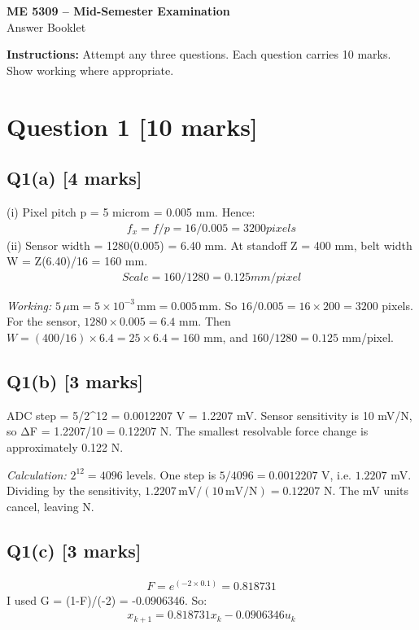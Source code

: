 \documentclass[11pt,a4paper]{article}
\begin{document}
\begin{center}
{\Large\bfseries ME 5309 -- Mid-Semester Examination}\\[3pt]
{\large Answer Booklet}\\[8pt]
\end{center}
\textbf{Instructions:} Attempt any three questions. Each question carries 10 marks. Show working where appropriate.
\section*{Question 1 \hfill [10 marks]}
\subsection*{Q1(a) \hfill [4 marks]}

(i) Pixel pitch p = 5 microm = 0.005 mm.
Hence:\[\begin{aligned}f_x = f/p = 16/0.005 = 3200 pixels\end{aligned}\]
(ii) Sensor width = 1280(0.005) = 6.40 mm.
At standoff Z = 400 mm, belt width W = Z(6.40)/16 = 160 mm.
\[\begin{aligned}Scale = 160/1280 = 0.125 mm/pixel\end{aligned}\]\par\smallskip\textit{Working:} $5\,\mu\mathrm{m}=5\times10^{-3}\,\mathrm{mm}=0.005\,\mathrm{mm}$. So $16/0.005=16\times200=3200$ pixels. For the sensor, $1280\times0.005=6.4$ mm. Then $W=(400/16)\times6.4=25\times6.4=160$ mm, and $160/1280=0.125$ mm/pixel.

\subsection*{Q1(b) \hfill [3 marks]}

ADC step = 5/2\textasciicircum{}12 = 0.0012207 V = 1.2207 mV.
Sensor sensitivity is 10 mV/N, so ΔF = 1.2207/10 = 0.12207 N.
The smallest resolvable force change is approximately 0.122 N.\par\smallskip\textit{Calculation:} $2^{12}=4096$ levels. One step is $5/4096=0.0012207$ V, i.e. $1.2207$ mV. Dividing by the sensitivity, $1.2207\,\mathrm{mV}/(10\,\mathrm{mV/N})=0.12207$ N. The mV units cancel, leaving N.

\subsection*{Q1(c) \hfill [3 marks]}

\[\begin{aligned}F = e^(-2\times0.1) = 0.818731\end{aligned}\]
I used G = (1-F)/(-2) = -0.0906346.
So:\[\begin{aligned}x_{k+1} = 0.818731x_k - 0.0906346u_k\end{aligned}\]
\end{document}
